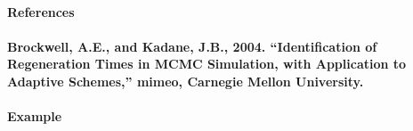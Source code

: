 \paragraph{References}\label{references}

\paragraph{Brockwell, A.E., and Kadane, J.B., 2004. ``Identification of
Regeneration Times in MCMC Simulation, with Application to Adaptive
Schemes,'' mimeo, Carnegie Mellon
University.}\label{brockwell-a.e.-and-kadane-j.b.-2004.-identification-of-regeneration-times-in-mcmc-simulation-with-application-to-adaptive-schemes-mimeo-carnegie-mellon-university.}

\paragraph{Example}\label{example}


